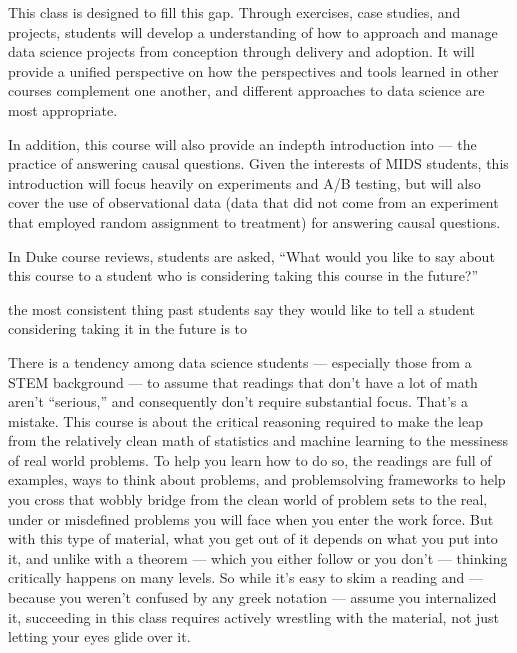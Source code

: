 \documentclass[letterpaper,10pt,english]{jupyterBook}
\begin{document}
\sphinxAtStartPar
This class is designed to fill this gap. Through exercises, case studies, and projects, students will develop a  understanding of how to approach and manage data science projects from conception through delivery and adoption. It will provide a unified perspective on how the perspectives and tools learned in other courses complement one another, and  different approaches to data science are most appropriate.

\sphinxAtStartPar
In addition, this course will also provide an in\sphinxhyphen{}depth introduction into  — the practice of answering causal questions. Given the interests of MIDS students, this introduction will focus heavily on experiments and A/B testing, but will also cover the use of observational data (data that did not come from an experiment that employed random assignment to treatment) for answering causal questions.

\begin{DUlineblock}{0em}
\item[] 
\end{DUlineblock}

\sphinxAtStartPar
In Duke course reviews, students are asked, “What would you like to say about this course to a student who is considering taking this course in the future?”

\sphinxAtStartPar
{} the most consistent thing past students say they would like to tell a student considering taking it in the future is to 

\sphinxAtStartPar
There is a tendency among data science students — especially those from a STEM background — to assume that readings that don’t have a lot of math aren’t “serious,” and consequently don’t require substantial focus. That’s a mistake. This course is about the critical reasoning required to make the leap from the relatively clean math of statistics and machine learning to the messiness of real world problems. To help you learn how to do so, the readings are full of examples, ways to think about problems, and problem\sphinxhyphen{}solving frameworks to help you cross that wobbly bridge from the clean world of problem sets to the real, under\sphinxhyphen{} or mis\sphinxhyphen{}defined problems you will face when you enter the work force. But with this type of material, what you get out of it depends on what you put into it, and unlike with a theorem — which you either follow or you don’t — thinking critically happens on many levels. So while it’s easy to skim a reading and — because you weren’t confused by any greek notation — assume you internalized it, succeeding in this class requires actively wrestling with the material, not just letting your eyes glide over it.
\end{document}
